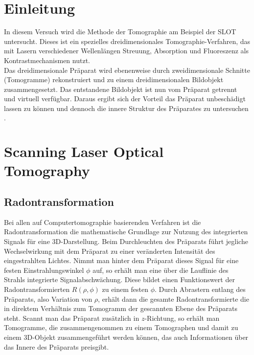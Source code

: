 



\section{Einleitung}
In diesem Versuch wird die Methode der Tomographie am Beispiel der SLOT \\ \glqq {}\grqq{} untersucht. Dieses ist ein spezielles dreidimensionales Tomographie-Verfahren, das mit Lasern verschiedener Wellenlängen  Streuung, Absorption und Fluoreszenz als Kontrastmechanismen nutzt.\\

Das dreidimensionale Präparat wird ebenenweise durch zweidimensionale Schnitte (Tomogramme) rekonstruiert und zu einem dreidimensionalen Bildobjekt zusammengesetzt. Das entstandene Bildobjekt ist nun vom Präparat getrennt und virtuell verfügbar. Daraus ergibt sich der Vorteil das Präparat unbeschädigt lassen zu können und dennoch die innere Struktur des Präparates zu untersuchen \cite{Anleitung}.\\

\section{Scanning Laser Optical Tomography}

\subsection{Radontransformation}
Bei allen auf Computertomographie basierenden Verfahren ist die Radontransformation die mathematische Grundlage zur Nutzung des integrierten Signals für eine 3D-Darstellung.
Beim Durchleuchten des Präparats führt jegliche Wechselwirkung mit dem Präparat zu einer veränderten Intensität des eingestrahlten Lichtes.
Nimmt man hinter dem Präparat dieses Signal für eine festen Einstrahlungswinkel $\phi$ auf, so erhält man eine über die Lauflinie des Strahls integrierte Signalabschwächung.
Diese bildet einen Funktionswert der Radontransformierten $R(\rho,\phi)$ zu einem festen $\phi$.
Durch Abrastern entlang des Präparats, also Variation von $\rho$, erhält dann die gesamte Radontransformierte die in direktem Verhältnis zum Tomogramm der gescannten Ebene des Präparats steht.
Scannt man das Präparat zusätzlich in $z$-Richtung, so erhält man Tomogramme, die zusammengenommen zu einem Tomographen und damit zu einem 3D-Objekt zusammengeführt werden können, das auch Informationen über das Innere des Präparats preisgibt.

